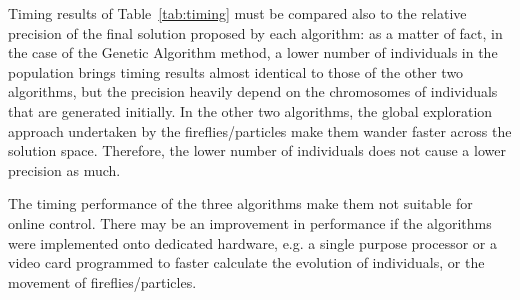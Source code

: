 Timing results of Table~\ref{tab:timing} must be compared also to the relative
precision of the final solution proposed by each algorithm: as a matter of fact,
in the case of the Genetic Algorithm method, a lower number of individuals 
in the population brings timing results almost identical to those of the other two
algorithms, but the precision heavily depend on the chromosomes of individuals
that are generated initially. In the other two algorithms, the global exploration
approach undertaken by the fireflies/particles make them wander faster across
the solution space. Therefore, the lower number of individuals does not
cause a lower precision as much.

The timing performance of the three algorithms make them not suitable for online control.
There may be an improvement in performance if the algorithms were implemented onto
dedicated hardware, e.g. a single purpose processor or a video card programmed
to faster calculate the evolution of individuals, or the movement of fireflies/particles.



